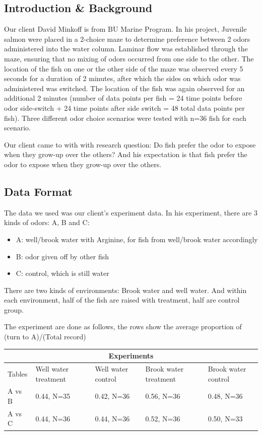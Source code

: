 \documentclass{article}
\begin{document}
	\subsection{Introduction \& Background}
	Our client David Minkoff is from BU Marine Program. In his project, Juvenile salmon were placed in a 2-choice maze to determine preference between 2 odors administered into the water column. Laminar flow was established through the maze, ensuring that no mixing of odors occurred from one side to the other. The location of the fish on one or the other side of the maze was observed every 5 seconds for a duration of 2 minutes, after which the sides on which odor was administered was switched. The location of the fish was again observed for an additional 2 minutes (number of data points per fish = 24 time points before odor side-switch + 24 time points after side switch = 48 total data points per fish). Three different odor choice scenarios were tested with n=36 fish for each scenario.
	
	Our client came to with with research question: Do fish prefer the odor to expose when they grow-up over the others? And his expectation is that fish prefer the odor to expose when they grow-up over the others. 
	\subsection{Data Format}
	The data we used was our client's experiment data. In his experiment, there are 3 kinds of odors: A, B and C:
	\begin{itemize}
		\item A: well/brook water with Arginine, for fish from well/brook water accordingly
		\item B: odor given off by other fish
		\item C: control, which is still water
	\end{itemize}
	
	There are two kinds of environments: Brook water and well water. And within each environment, half of the fish are raised with treatment, half are control group.
	
	The experiment are done as follows, the rows show the average proportion of (turn to A)/(Total record)
	
	\begin{tabular}{ |p{2cm}||p{2cm}|p{2cm}|p{2cm}|p{2cm}|  }
		\hline
		\multicolumn{5}{|c|}{Experiments} \\
		\hline
		Tables& Well water treatment &Well water control &Brook water treatment &Brook water control\\
		\hline
		A vs B   & 0.44, N=35   &0.42, N=36&0.56, N=36&0.48, N=36\\
		A vs C 	 & 0.44, N=36  	&0.44, N=36&0.52, N=36&0.50, N=33\\
		\hline
	\end{tabular}\\
	
\end{document}
